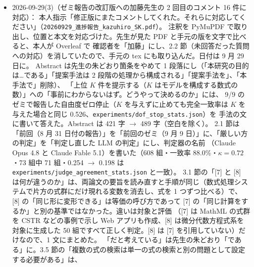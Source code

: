 \documentclass[11pt,a4paper]{jsarticle}
\begin{document}
\begin{itemize}[nosep]
    第 1 章の書き方とそろえた。引用は番号順に \verb|\cite{DAEEquiv,ZhangEquiv}|）。
    (2) ``Context should matter where variables cannot decide'' を ``Context is needed \ldots'' に（報告の「だと考えている」$\to$「である」に合わせた）。
    (3) \S2.5 の ``retrieving several equations as one answer is a different problem \ldots\ calls for its own task definition'' を削除し、
    ``We found no formula-search benchmark that imposes this joint condition.'' で止めた。
    K の決め方は第 2 章ですでに ``can stop once the selected set closes as a system (Chapter~3)'' と書いているので変更なし。
    \texttt{latexmk -gg} exit 0・32 ページ・未定義参照なし・引用の初出順と参考文献の並び（39 件）が一致。
  \item 2026-09-29(3)（ゼミ報告の改訂版への加藤先生の 2 回目のコメント 16 件に対応）：
    本人指示「修正版にまたコメントしてくれた。それらに対応してください」（\texttt{20260929\_進捗報告\_kazuhiro\_SK.pdf}）。
    注釈を PyMuPDF で取り出し、位置と本文を対応づけた。先生が見た PDF と手元の版を文字で比べると、本人が Overleaf で
    確認者を「加藤」にし、2.2 節（未回答だった質問への対応）を消していたので、手元の tex にも取り込んだ。日付は 9 月 29 日に。
    Abstract は先生の朱どおり箇条をやめて 1 段落にし（「本研究の目的は…である」「提案手法は 2 段階の処理から構成される」「提案手法を」、「本手法で」削除）、
    「上位 $K$ 件を提示する（$K$ はモデルを構成する数式の数）」への「事前にわからないはず。どうやって決めるのか」には、
    9/9 のゼミで報告した自由度ゼロ停止（$K$ を与えずに止めても完全一致率は $K$ を与えた場合と同じ 0.526、\texttt{experiments/dof\_stop\_stats.json}）を
    手法の文に書いて答えた。Abstract は 421 字 $\to$ 489 字（空白を除く）。
    2.1 節は「前回（8 月 31 日付の報告）」を「前回のゼミ（9 月 9 日）」に、「厳しい方の判定」を「判定し直した LLM の判定」にし、判定器の名前
    （Claude Opus 4.8 と Claude Fable 5.1）を書いた（608 組・一致率 88.0\%・$\kappa = 0.72$・73 組中 71 組・0.254 $\to$ 0.198 は \texttt{experiments/judge\_agreement\_stats.json} と一致）。
    3.1 節の「[7] と [8] は何が違うのか」は、両論文の要旨を読み直すと手順が同じ（数式処理システムで片方の式群にだけ現れる変数を消去し、式を 1 つずつ比べる）で、
    [8] の「同じ形に変形できる」は等価の呼び方であって [7] の「同じ計算をするか」と別の基準ではなかった。違いは対象と評価
    （[7] は MathML の式群を CSTR などの事例で示し Web アプリも作成、[8] は微分代数方程式系を対象に生成した 50 組ですべて正しく判定。[8] は [7] を引用していない）だけなので、1 文にまとめた。
    「だと考えている」は先生の朱どおり「である」に。3.5 節の「複数の式の検索は単一の式の検索と別の問題として設定する必要がある」は、

\end{itemize}
\end{document}
